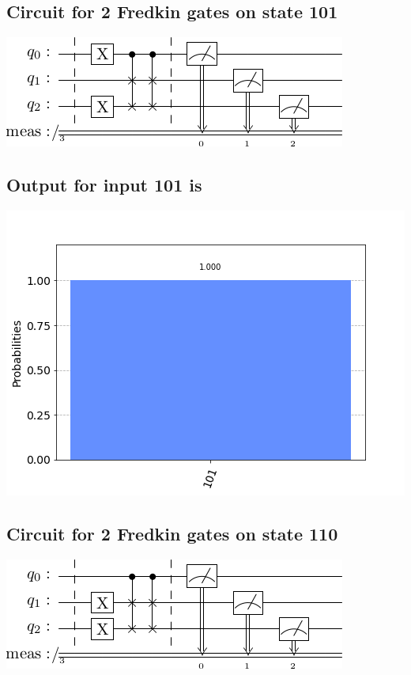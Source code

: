 \documentclass[a4paper]{article}
\begin{document}
\begin{answer}[Question 1 a]
        \subsection*{Circuit for 2 Fredkin gates on state 101}
        \includegraphics[scale = 0.5]{1a101.png}
        \subsection*{Output for input 101 is}
        \includegraphics[scale = 0.5]{1a101-out.png}
        \subsection*{Circuit for 2 Fredkin gates on state 110}
        \includegraphics[scale = 0.5]{1a110.png}

\end{answer}
\end{document}

